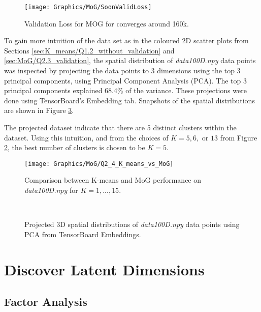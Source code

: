\documentclass[a4paper,12pt]{article}
\begin{document}
\begin{figure}[!htb]
\centering
\texttt{[image: Graphics/MoG/SoonValidLoss]}
\caption{Validation Loss for MOG for converges around 160k.}
\label{fig:Soon}
\end{figure}


To gain more intuition of the data set as in the coloured 2D scatter plots from Sections \ref{sec:K_means/Q1.2_without_validation} and \ref{sec:MoG/Q2.3_validation}, the spatial distribution of \textit{data100D.npy} data points was inspected by projecting the data points to 3 dimensions using the top 3 principal components, using Principal Component Analysis (PCA). The top 3 principal components explained 68.4\% of the variance. These projections were done using TensorBoard's Embedding tab. Snapshots of the spatial distributions are shown in Figure \ref{fig:MoG/Q2_4_tensorboard}.

The projected dataset indicate that there are 5 distinct clusters within the dataset. Using this intuition, and from the choices of $K = 5, 6, \text{ or } 13$ from Figure \ref{fig:Q2_4_K_means_vs_MoG}, the best number of clusters is chosen to be $K = 5$.

\begin{figure}[!htb]
\centering
\texttt{[image: Graphics/MoG/Q2\_4\_K\_means\_vs\_MoG]}
\caption{Comparison between K-means and MoG performance on \textit{data100D.npy} for $K = 1, ..., 15$.}
\label{fig:Q2_4_K_means_vs_MoG}
\end{figure}

\begin{figure}[!htb]
\centering
{} \\
\caption{Projected 3D spatial distributions of \textit{data100D.npy} data points using PCA from TensorBoard Embeddings.}
\label{fig:MoG/Q2_4_tensorboard}
\end{figure}

\clearpage
\section{Discover Latent Dimensions}
\subsection{Factor Analysis}
\end{document}
